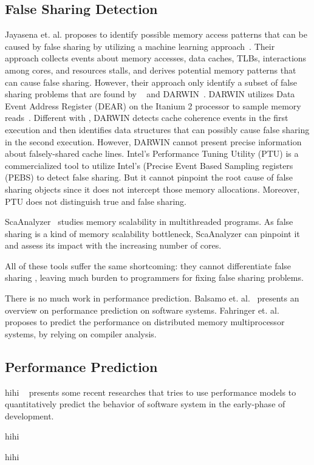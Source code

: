 \subsection{False Sharing Detection}
Jayasena et. al. proposes to identify possible memory access patterns that can be caused by false sharing by utilizing a machine learning approach~\cite{mldetect}. Their approach collects events about memory accesses, data caches, TLBs, interactions among cores, and resources stalls, and derives potential memory patterns that can cause false sharing. However, their approach only identify a subset of false sharing problems that are found by \Predator{}~\cite{Predator} and DARWIN~\cite{openmp}. DARWIN utilizes Data Event Address Register (DEAR) on the Itanium 2 processor to sample memory reads~\cite{Wicaksono11detectingfalse, openmp}. Different with \Cheetah{}, DARWIN detects cache coherence events in the first execution and then identifies data structures that can possibly cause false sharing in the second execution.  However, DARWIN cannot present precise information about falsely-shared cache lines. Intel's Performance Tuning Utility (PTU) is a commercialized tool to utilize Intel's (Precise Event Based Sampling registers (PEBS) to detect false sharing. But it cannot pinpoint the root cause of false sharing objects since it does not intercept those memory allocations. Moreover, PTU does not distinguish true and false sharing. 

ScaAnalyzer~\cite{ibs-sc2} studies memory scalability in multithreaded programs. As false sharing is a kind of memory scalability bottleneck, ScaAnalyzer can pinpoint it and assess its impact with the increasing number of cores. 

All of these tools suffer the same shortcoming: they cannot differentiate false sharing , leaving much burden to programmers for fixing false sharing problems. 

There is no much work in performance prediction. Balsamo et. al.~\cite{Balsamo:2004:MPP:987527.987640} presents an overview on performance prediction on software systems. 
Fahringer et. al. proposes to predict the performance on distributed memory multiprocessor systems, by relying on compiler analysis. 

\subsection{Performance Prediction}

hihi ~\cite{Balsamo:2004:MPP:987527.987640} presents some recent researches that tries to use performance models to quantitatively predict the behavior of software system in the early-phase of development. 

hihi ~\cite{impactofsharing}

hihi~\cite{Joao:2012:BIS:2150976.2151001} 


